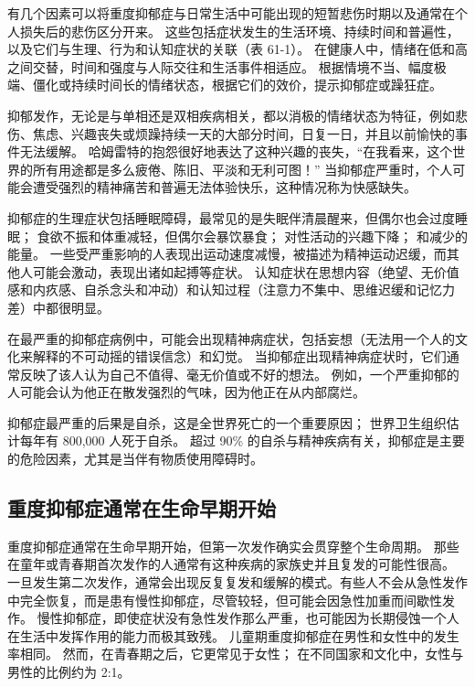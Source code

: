 有几个因素可以将重度抑郁症与日常生活中可能出现的短暂悲伤时期以及通常在个人损失后的悲伤区分开来。
这些包括症状发生的生活环境、持续时间和普遍性，以及它们与生理、行为和认知症状的关联（表 61-1）。
在健康人中，情绪在低和高之间交替，时间和强度与人际交往和生活事件相适应。
根据情境不当、幅度极端、僵化或持续时间长的情绪状态，根据它们的效价，提示抑郁症或躁狂症。


抑郁发作，无论是与单相还是双相疾病相关，都以消极的情绪状态为特征，例如悲伤、焦虑、兴趣丧失或烦躁持续一天的大部分时间，日复一日，并且以前愉快的事件无法缓解。
哈姆雷特的抱怨很好地表达了这种兴趣的丧失，“在我看来，这个世界的所有用途都是多么疲倦、陈旧、平淡和无利可图！” 
当抑郁症严重时，个人可能会遭受强烈的精神痛苦和普遍无法体验快乐，这种情况称为快感缺失。


抑郁症的生理症状包括睡眠障碍，最常见的是失眠伴清晨醒来，但偶尔也会过度睡眠；
食欲不振和体重减轻，但偶尔会暴饮暴食；
对性活动的兴趣下降； 和减少的能量。
一些受严重影响的人表现出运动速度减慢，被描述为精神运动迟缓，而其他人可能会激动，表现出诸如起搏等症状。
认知症状在思想内容（绝望、无价值感和内疚感、自杀念头和冲动）和认知过程（注意力不集中、思维迟缓和记忆力差）中都很明显。


在最严重的抑郁症病例中，可能会出现精神病症状，包括妄想（无法用一个人的文化来解释的不可动摇的错误信念）和幻觉。
当抑郁症出现精神病症状时，它们通常反映了该人认为自己不值得、毫无价值或不好的想法。
例如，一个严重抑郁的人可能会认为他正在散发强烈的气味，因为他正在从内部腐烂。


抑郁症最严重的后果是自杀，这是全世界死亡的一个重要原因；
世界卫生组织估计每年有 800,000 人死于自杀。
超过 90\% 的自杀与精神疾病有关，抑郁症是主要的危险因素，尤其是当伴有物质使用障碍时。



\subsection{重度抑郁症通常在生命早期开始}

重度抑郁症通常在生命早期开始，但第一次发作确实会贯穿整个生命周期。
那些在童年或青春期首次发作的人通常有这种疾病的家族史并且复发的可能性很高。
一旦发生第二次发作，通常会出现反复复发和缓解的模式。有些人不会从急性发作中完全恢复，而是患有慢性抑郁症，尽管较轻，但可能会因急性加重而间歇性发作。
慢性抑郁症，即使症状没有急性发作那么严重，也可能因为长期侵蚀一个人在生活中发挥作用的能力而极其致残。
儿童期重度抑郁症在男性和女性中的发生率相同。
然而，在青春期之后，它更常见于女性； 在不同国家和文化中，女性与男性的比例约为 2:1。



